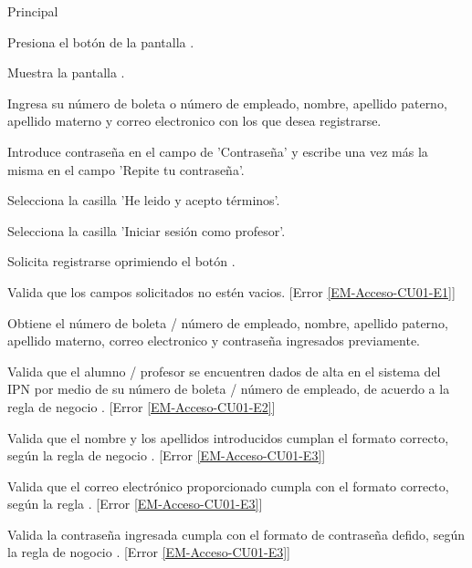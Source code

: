 	\begin{UCtrayectoria}{Principal}

		\UCpaso [\UCactor] Presiona el botón  de la pantalla .

		\UCpaso Muestra la pantalla .

		\UCpaso[\UCactor] Ingresa su número de boleta o número de empleado, nombre, apellido paterno, apellido materno y correo electronico con los que desea registrarse. \label{l_Acceso_CU1_E1}

	    \UCpaso[\UCactor] Introduce contraseña  en el campo de 'Contraseña' y escribe una vez más la misma en el campo 'Repite tu contraseña'.

	    \UCpaso[\UCactor] Selecciona la casilla 'He leido y acepto términos'.

	    \UCpaso[\UCactor] Selecciona la casilla 'Iniciar sesión como profesor'.  

		\UCpaso [\UCactor] Solicita registrarse oprimiendo el botón .

		\UCpaso Valida que los campos solicitados no estén vacios. [Error \ref{EM-Acceso-CU01-E1}] \label{Almacenainfo}

		\UCpaso Obtiene el número de boleta / número de empleado, nombre, apellido paterno, apellido materno, correo electronico y contraseña ingresados previamente.

		\UCpaso Valida que el alumno / profesor se encuentren dados de alta en el sistema del IPN por medio de su número de boleta / número de empleado, de acuerdo a la regla de negocio . [Error \ref{EM-Acceso-CU01-E2}]

		\UCpaso Valida que el nombre y los apellidos introducidos cumplan el formato correcto, según la regla de negocio . [Error \ref{EM-Acceso-CU01-E3}]

	    \UCpaso Valida que el correo electrónico proporcionado cumpla con el formato correcto, según la regla . [Error  \ref{EM-Acceso-CU01-E3}]

	    \UCpaso Valida la contraseña ingresada cumpla con el formato de contraseña defido, según la regla de nogocio . [Error  \ref{EM-Acceso-CU01-E3}]


\end{UCtrayectoria}
